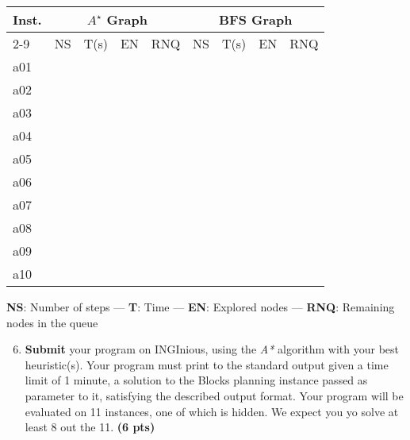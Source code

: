 \documentclass[11pt,a4paper]{report}
\begin{document}
\begin{answers}[9cm]

\begin{center}
\begin{tabular}{||l|l|l|l|l||l|l|l|l||}
\hline
\multirow{3}{*}{Inst.} & \multicolumn{4}{c|}{$A^{\star}$ Graph} & \multicolumn{4}{c||}{BFS Graph} \\
\cline{2-9}
\cline{2-9}
 & NS & T(s) & EN & RNQ & NS & T(s) & EN & RNQ\\
\hline
a01 & & & & & & & &\\
\hline
a02 & & & & & & & &\\
\hline
a03 & & & & & & & &\\
\hline
a04 & & & & & & & &\\
\hline
a05 & & & & & & & &\\
\hline
a06 & & & & & & & &\\
\hline
a07 & & & & & & & &\\
\hline
a08 & & & & & & & &\\
\hline
a09 & & & & & & & &\\
\hline
a10 & & & & & & & &\\
\hline
\end{tabular}
\end{center}
\textbf{NS}: Number of steps — \textbf{T}: Time — \textbf{EN}: Explored nodes — \textbf{RNQ}: Remaining nodes in the queue
\end{answers}



\begin{enumerate}
\setcounter{enumi}{5}
\item \textbf{Submit} your program on INGInious, using the \textit{A*} algorithm with your best heuristic(s). Your program must print to the standard output given a time limit of 1 minute, a solution to the Blocks planning instance passed as parameter to it, satisfying the described output format. Your program will be evaluated on 11 instances, one of which is hidden. We expect you yo solve at least 8 out the 11. \textbf{(6 pts)}
\end{enumerate}

\begin{answer}
\end{answer}
\end{document}
